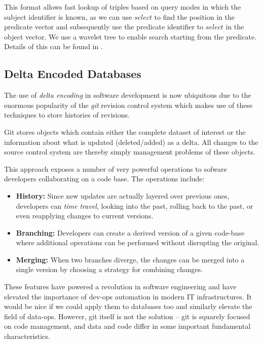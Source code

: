 \documentclass[10pt, a4paper, twocolumn]{article} %
\begin{document}
This format allows fast lookup of triples based on query modes in
which the subject identifier is known, as we can use \(select\) to
find the position in the predicate vector and subsequently use the
predicate identifier to \(select\) in the object vector. We use a
wavelet tree to enable search starting from the predicate. Details of
this can be found in \autocite{10.1007/978-3-642-30284-8_36}.

\subsection{Delta Encoded Databases}

The use of {\em delta encoding} in software development is now
ubiquitous due to the enormous popularity of the {\em git} revision
control system which makes use of these techniques to store histories
of revisions.

Git stores objects which contain either the complete dataset of
interest or the information about what is updated (deleted/added) as
a delta. All changes to the source control system are thereby simply
management problems of these objects.

This approach exposes a number of very powerful operations to sofware
developers collaborating on a code base. The operations include:

\begin{itemize}
\item {\bf History:} Since new updates are actually layered over previous
  ones, developers can {\em time travel}, looking into the past,
  rolling back to the past, or even reapplying changes to current
  versions.
\item {\bf Branching:} Developers can create a derived version of a given
  code-base where additional operations can be performed without
  disrupting the original.
\item {\bf Merging:} When two branches diverge, the changes can be merged
  into a single version by choosing a strategy for combining changes.
\end{itemize}

These features have powered a revolution in software engineering and
have elevated the importance of dev-ops automation in modern IT
infrastructures. It would be nice if we could apply them to databases
too and similarly elevate the field of data-ops. However, git itself
is not the solution – git is squarely focused on code management, and
data and code differ in some important fundamental characteristics.
\end{document}
